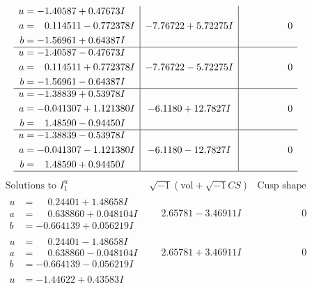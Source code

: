 \documentclass[1p]{elsarticle_modified}
\theoremstyle{definition}
\newcommand{\I}{\sqrt{-1}}
\begin{document}
$$\begin{array}{c|c|c}
\begin{aligned}
u &= -1.40587 + 0.47673 I \\
a &= \phantom{-}0.114511 - 0.772378 I \\
b &= -1.56961 + 0.64387 I\end{aligned}
 & -7.76722 + 5.72275 I & \phantom{-0.000000 } 0 \\ \hline\begin{aligned}
u &= -1.40587 - 0.47673 I \\
a &= \phantom{-}0.114511 + 0.772378 I \\
b &= -1.56961 - 0.64387 I\end{aligned}
 & -7.76722 - 5.72275 I & \phantom{-0.000000 } 0 \\ \hline\begin{aligned}
u &= -1.38839 + 0.53978 I \\
a &= -0.041307 + 1.121380 I \\
b &= \phantom{-}1.48590 - 0.94450 I\end{aligned}
 & -6.1180 + 12.7827 I & \phantom{-0.000000 } 0 \\ \hline\begin{aligned}
u &= -1.38839 - 0.53978 I \\
a &= -0.041307 - 1.121380 I \\
b &= \phantom{-}1.48590 + 0.94450 I\end{aligned}
 & -6.1180 - 12.7827 I & \phantom{-0.000000 } 0\\
 \hline 
 \end{array}$$\newpage$$\begin{array}{c|c|c}  
\text{Solutions to }I^u_{1}& \I (\text{vol} + \sqrt{-1}CS) & \text{Cusp shape}\\
 \hline 
\begin{aligned}
u &= \phantom{-}0.24401 + 1.48658 I \\
a &= \phantom{-}0.638860 + 0.048104 I \\
b &= -0.664139 + 0.056219 I\end{aligned}
 & \phantom{-}2.65781 - 3.46911 I & \phantom{-0.000000 } 0 \\ \hline\begin{aligned}
u &= \phantom{-}0.24401 - 1.48658 I \\
a &= \phantom{-}0.638860 - 0.048104 I \\
b &= -0.664139 - 0.056219 I\end{aligned}
 & \phantom{-}2.65781 + 3.46911 I & \phantom{-0.000000 } 0 \\ \hline\begin{aligned}
u &= -1.44622 + 0.43583 I \\

\end{aligned}
\end{array}$$
\end{document}
